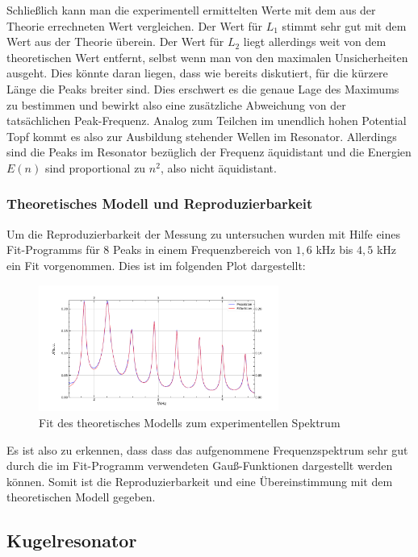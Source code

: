 \documentclass[german,  %
parskip=full,  %
]{scrartcl}
\begin{document}
Schließlich kann man die experimentell ermittelten Werte mit dem aus der Theorie errechneten Wert vergleichen. Der Wert für $L_1$ stimmt sehr gut mit dem Wert aus der Theorie überein. Der Wert für $L_2$ liegt allerdings weit von dem theoretischen Wert entfernt, selbst wenn man von den maximalen Unsicherheiten ausgeht. Dies könnte daran liegen, dass wie bereits diskutiert, für die kürzere Länge die Peaks breiter sind. Dies erschwert es die genaue Lage des Maximums zu bestimmen und bewirkt also eine zusätzliche Abweichung von der tatsächlichen Peak-Frequenz.
\newline
\newline Analog zum Teilchen im unendlich hohen Potential Topf kommt es also zur Ausbildung stehender Wellen im Resonator. Allerdings sind die Peaks im Resonator bezüglich der Frequenz äquidistant und die Energien $E(n)$ sind proportional zu $n^2$, also nicht äquidistant.

\subsubsection{Theoretisches Modell und Reproduzierbarkeit}
Um die Reproduzierbarkeit der Messung zu untersuchen wurden mit Hilfe eines Fit-Programms für 8 Peaks in einem Frequenzbereich von $1,6$ kHz bis $4,5$ kHz ein Fit vorgenommen. Dies ist im folgenden Plot dargestellt: 
\begin{figure}[h!]
\centering
\includegraphics[width=0.7\textwidth]{Messung_L2_und_Fitfunktion.png}
\caption{Fit des theoretisches Modells zum experimentellen Spektrum}
\end{figure}
\newpage
Es ist also zu erkennen, dass dass das aufgenommene Frequenzspektrum sehr gut durch die im Fit-Programm verwendeten Gauß-Funktionen dargestellt werden können.
Somit ist die Reproduzierbarkeit und eine Übereinstimmung mit dem theoretischen Modell gegeben.

\subsection{Kugelresonator}
\end{document}
